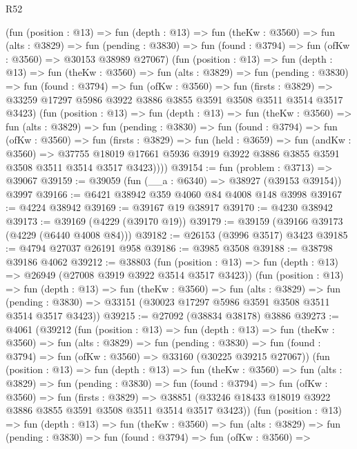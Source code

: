\begin{lexlean}{R52}
\begin{coremodule}
          (fun (position : @13) =>
          fun (depth : @13) =>
          fun (theKw : @3560) =>
          fun (alts : @3829) =>
          fun (pending : @3830) =>
          fun (found : @3794) => fun (ofKw : @3560) => @30153 @38989 @27067)
          (fun (position : @13) =>
          fun (depth : @13) =>
          fun (theKw : @3560) =>
          fun (alts : @3829) =>
          fun (pending : @3830) =>
          fun (found : @3794) =>
          fun (ofKw : @3560) =>
          fun (firsts : @3829) =>
          @33259 @17297 @5986 @3922 @3886 @3855 @3591 @3508 @3511 @3514 @3517 @3423)
          (fun (position : @13) =>
          fun (depth : @13) =>
          fun (theKw : @3560) =>
          fun (alts : @3829) =>
          fun (pending : @3830) =>
          fun (found : @3794) =>
          fun (ofKw : @3560) =>
          fun (firsts : @3829) =>
          fun (held : @3659) =>
          fun (andKw : @3560) =>
          @37755 @18019 @17661 @5936 @3919 @3922 @3886 @3855 @3591 @3508 @3511 @3514 @3517 @3423))))
@39154 := fun (problem : @3713) => @39067
@39159 := @39059 (fun (__a : @6340) => @38927 (@39153 @39154)) @3997
@39166 := @6421 @38942 @359 @4060 @84 @4008 @148 @3998
@39167 := @4224 @38942
@39169 := @39167 @19 @38917
@39170 := @4230 @38942
@39173 := @39169 (@4229 (@39170 @19))
@39179 := @39159 (@39166 @39173 (@4229 (@6440 @4008 @84)))
@39182 := @26153 (@3996 @3517) @3423
@39185 := @4794 @27037 @26191 @958
@39186 := @3985 @3508
@39188 := @38798 @39186 @4062
@39212 := @38803
    (fun (position : @13) => fun (depth : @13) => @26949 (@27008 @3919 @3922 @3514 @3517 @3423))
    (fun (position : @13) =>
    fun (depth : @13) =>
    fun (theKw : @3560) =>
    fun (alts : @3829) =>
    fun (pending : @3830) => @33151 (@30023 @17297 @5986 @3591 @3508 @3511 @3514 @3517 @3423))
@39215 := @27092 (@38834 @38178) @3886
@39273 := @4061
    (@39212
      (fun (position : @13) =>
      fun (depth : @13) =>
      fun (theKw : @3560) =>
      fun (alts : @3829) =>
      fun (pending : @3830) =>
      fun (found : @3794) => fun (ofKw : @3560) => @33160 (@30225 @39215 @27067))
      (fun (position : @13) =>
      fun (depth : @13) =>
      fun (theKw : @3560) =>
      fun (alts : @3829) =>
      fun (pending : @3830) =>
      fun (found : @3794) =>
      fun (ofKw : @3560) =>
      fun (firsts : @3829) =>
      @38851 (@33246 @18433 @18019 @3922 @3886 @3855 @3591 @3508 @3511 @3514 @3517 @3423))
      (fun (position : @13) =>
      fun (depth : @13) =>
      fun (theKw : @3560) =>
      fun (alts : @3829) =>
      fun (pending : @3830) =>
      fun (found : @3794) =>
      fun (ofKw : @3560) =>

\end{coremodule}
\end{lexlean}

